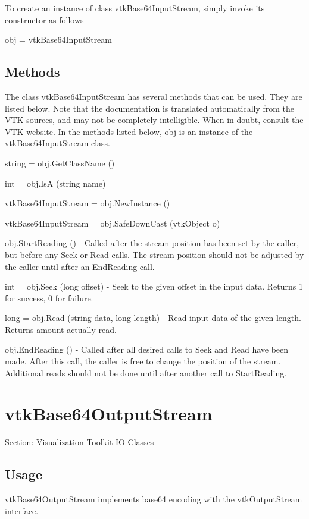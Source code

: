To create an instance of class vtk\-Base64\-Input\-Stream, simply invoke its constructor as follows \begin{DoxyVerb}  obj = vtkBase64InputStream
\end{DoxyVerb}
 \hypertarget{vtkwidgets_vtkxyplotwidget_Methods}{}\subsection{Methods}\label{vtkwidgets_vtkxyplotwidget_Methods}
The class vtk\-Base64\-Input\-Stream has several methods that can be used. They are listed below. Note that the documentation is translated automatically from the V\-T\-K sources, and may not be completely intelligible. When in doubt, consult the V\-T\-K website. In the methods listed below, {\ttfamily obj} is an instance of the vtk\-Base64\-Input\-Stream class. 
\begin{DoxyItemize}
\item {\ttfamily string = obj.\-Get\-Class\-Name ()}  
\item {\ttfamily int = obj.\-Is\-A (string name)}  
\item {\ttfamily vtk\-Base64\-Input\-Stream = obj.\-New\-Instance ()}  
\item {\ttfamily vtk\-Base64\-Input\-Stream = obj.\-Safe\-Down\-Cast (vtk\-Object o)}  
\item {\ttfamily obj.\-Start\-Reading ()} -\/ Called after the stream position has been set by the caller, but before any Seek or Read calls. The stream position should not be adjusted by the caller until after an End\-Reading call.  
\item {\ttfamily int = obj.\-Seek (long offset)} -\/ Seek to the given offset in the input data. Returns 1 for success, 0 for failure.  
\item {\ttfamily long = obj.\-Read (string data, long length)} -\/ Read input data of the given length. Returns amount actually read.  
\item {\ttfamily obj.\-End\-Reading ()} -\/ Called after all desired calls to Seek and Read have been made. After this call, the caller is free to change the position of the stream. Additional reads should not be done until after another call to Start\-Reading.  
\end{DoxyItemize}\hypertarget{vtkio_vtkbase64outputstream}{}\section{vtk\-Base64\-Output\-Stream}\label{vtkio_vtkbase64outputstream}
Section\-: \hyperlink{sec_vtkio}{Visualization Toolkit I\-O Classes} \hypertarget{vtkwidgets_vtkxyplotwidget_Usage}{}\subsection{Usage}\label{vtkwidgets_vtkxyplotwidget_Usage}
vtk\-Base64\-Output\-Stream implements base64 encoding with the vtk\-Output\-Stream interface.


